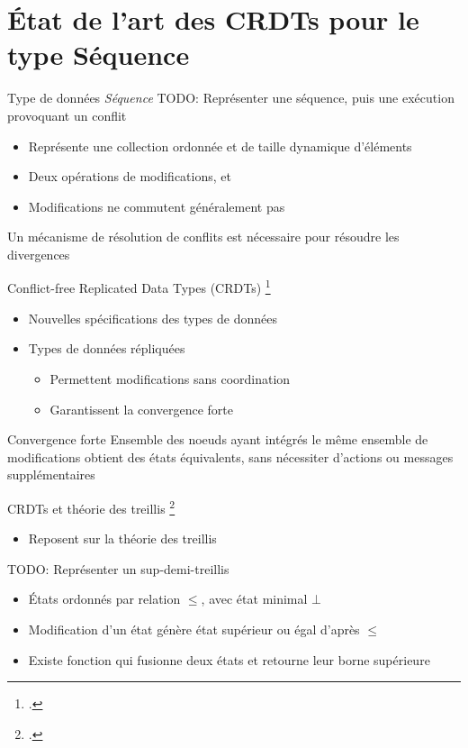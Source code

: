 \section{État de l'art des CRDTs pour le type Séquence}

\begin{frame}{Type de données \emph{Séquence}}
    TODO: Représenter une séquence, puis une exécution provoquant un conflit
    \begin{itemize}
        \item Représente une collection ordonnée et de taille dynamique d'éléments
        \item Deux opérations de modifications, \ins et \rmv
        \item Modifications ne commutent généralement pas
    \end{itemize}
    Un mécanisme de résolution de conflits est nécessaire pour résoudre les divergences
\end{frame}

\begin{frame}{Conflict-free Replicated Data Types (CRDTs) \footcite{shapiro_2011_crdt}}
    \begin{itemize}
        \item Nouvelles spécifications des types de données
        \item Types de données répliquées
        \begin{itemize}
            \item Permettent modifications sans coordination
            \item Garantissent la convergence forte
        \end{itemize}
    \end{itemize}
    \begin{alertblock}{Convergence forte}
        Ensemble des noeuds ayant intégrés le même ensemble de modifications obtient des états équivalents, sans nécessiter d'actions ou messages supplémentaires
    \end{alertblock}
\end{frame}

\begin{frame}{CRDTs et théorie des treillis \footcite{2002-intro-lattices-order-davey}}
    \begin{itemize}
        \item Reposent sur la théorie des treillis
    \end{itemize}
    TODO: Représenter un sup-demi-treillis
    \begin{itemize}
        \item États ordonnés par relation $\leq$, avec état minimal $\bot$
        \item Modification d'un état génère état supérieur ou égal d'après $\leq$
        \item Existe fonction qui fusionne deux états et retourne leur borne supérieure
    \end{itemize}
\end{frame}

